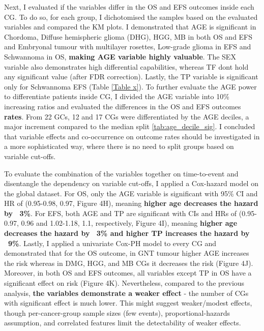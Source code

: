 \documentclass[a4paper,11pt]{article}
\begin{document}
Next, I evaluated if the variables differ in the OS and EFS outcomes inside each CG. To do so, for each group, I dichotomised
the samples based on the evaluated variables and compared the KM plots. I demonstrated that AGE is significant in Chordoma, 
Diffuse hemispheric glioma (DHG), HGG, MB in both OS and EFS and Embryonal tumour with multilayer rosettes, Low-grade glioma in EFS and Schwannoma in OS, 
\textbf{making AGE variable highly valuable}. The SEX variable also demonstrates high differential capabilities, whereas TF dont hold any significant value (after FDR correction).
Lastly, the TP variable is significant only for Schwannoma EFS (Table \ref{Table x}). 
To further evaluate the AGE power to differentiate patients inside CG, I divided the AGE variable into 10\% increasing ratios
and evaluated the differences in the OS and EFS outcomes \textbf{rates}. From 22 GCs, 12 and 17 CGs were differentiated by the 
AGE deciles, a major increment compared to the median split \ref{tab:age_decile_sig}.
I concluded that variable effects and co-occurrence on outcome rates should be investigated in a more sophisticated way,
where there is no need to split groups based on variable cut-offs. 





To evaluate the combination of the variables together on time-to-event and disentangle the dependency on variable cut-offs, I applied
a Cox-hazard model on the global dataset. For OS, only the AGE variable is significant
with 95\% CI and HR of (0.95-0.98, 0.97, Figure 4H), meaning \textbf{higher age decreases the hazard by ~3\%}. 
For EFS, both AGE and TP are significant with CIs and HRs of (0.95-0.97, 0.96 and 1.02-1.18, 1.1, respectively, Figure 4I), meaning
\textbf{higher age decreases the hazard by ~3\% and higher TP increases the hazard by ~9\%}. 
Lastly, I applied a univariate Cox-PH model to every CG and demonstrated that for the OS outcome, in GNT tumour higher AGE increases
the risk whereas in DMG, HGG, and MB CGs it decreases the risk (Figure 4J). Moreover, in both OS and EFS outcomes, 
all variables except TP in OS have a significant effect on risk (Figure 4K). Nevertheless, compared to the previous analysis,
\textbf{the variables demonstrate a weaker effect} - the number of CGs with significant effect is much lower.
This might suggest weaker/modest effects, though per-cancer-group sample sizes (few events), proportional-hazards
assumption, and correlated features limit the detectability of weaker effects.
\end{document}
